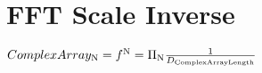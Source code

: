 \documentclass{article}
\begin{document}
\section{FFT Scale Inverse}
$
ComplexArray_\textrm{N} = f^\textrm{N} = \Pi_\textrm{N} \frac{1} {D_\textrm{ComplexArrayLength}}\\
$
\end{document}
